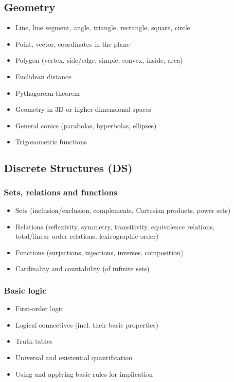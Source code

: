 \documentclass[12pt]{article}
\begin{document}
	\subsection{Geometry}
		\begin{itemize}[label=]
			\item Line, line segment, angle, triangle, rectangle, square, circle
			\item Point, vector, coordinates in the plane
			\item Polygon (vertex, side/edge, simple, convex, inside, area)
			\item Euclidean distance
			\item Pythagorean theorem
		\end{itemize}
	
		\begin{itemize}[label=]
			\item Geometry in 3D or higher dimensional spaces 
			\item General conics (parabolas, hyperbolas, ellipses)
			\item Trigonometric functions
		\end{itemize}
	
	\subsection{Discrete Structures (DS)}
		\newcommand{\type}{DS}
		\subsubsection{Sets, relations and functions}
		\begin{itemize}[label=]
			\item Sets (inclusion/exclusion, complements, Cartesian products, power sets)
			\item Relations (reflexivity, symmetry, transitivity, equivalence relations, total/linear order relations, lexicographic order)
			\item Functions (surjections, injections, inverses, composition)
		\end{itemize}
		
		\begin{itemize}[label=]
			\item Cardinality and countability (of infinite sets)
		\end{itemize}
		
		\subsubsection{Basic logic}
		\begin{itemize}[label=]
			\item First-order logic
			\item Logical connectives (incl. their basic properties)
			\item Truth tables
			\item Universal and existential quantification
			\item Using and applying basic rules for implication
		\end{itemize}
	
\end{document}
